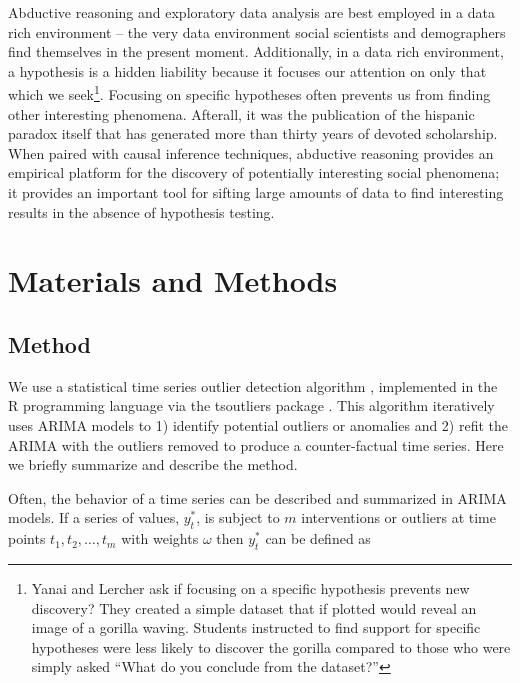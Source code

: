 \documentclass[12pt]{article}
\begin{document}
Abductive reasoning and exploratory data analysis are best employed in a
data rich environment -- the very data environment social scientists and
demographers find themselves in the present moment. Additionally, in a
data rich environment, a hypothesis is a hidden liability
\citep{yanai_hypothesis_2020}because it focuses our attention on only
that which we seek\footnote{Yanai and Lercher
  \citeyearpar{yanai_hypothesis_2020} ask if focusing on a specific
  hypothesis prevents new discovery? They created a simple dataset that
  if plotted would reveal an image of a gorilla waving. Students
  instructed to find support for specific hypotheses were less likely to
  discover the gorilla compared to those who were simply asked ``What do
  you conclude from the dataset?''}. Focusing on specific hypotheses
often prevents us from finding other interesting phenomena. Afterall, it
was the publication of the hispanic paradox itself that has generated
more than thirty years of devoted scholarship. When paired with causal
inference techniques, abductive reasoning provides an empirical platform
for the discovery of potentially interesting social phenomena; it
provides an important tool for sifting large amounts of data to find
interesting results in the absence of hypothesis testing.

\hypertarget{materials-and-methods}{%
\section{Materials and Methods}\label{materials-and-methods}}

\hypertarget{method}{%
\subsection{Method}\label{method}}

We use a statistical time series outlier detection algorithm
\citep{chen1993joint}, implemented in the R programming language
\citep{rcore} via the tsoutliers package \citep{tsoutliers2019}. This
algorithm iteratively uses ARIMA models to 1) identify potential
outliers or anomalies and 2) refit the ARIMA with the outliers removed
to produce a counter-factual time series. Here we briefly summarize and
describe the method.

Often, the behavior of a time series can be described and summarized in
ARIMA models. If a series of values, \(y_t^*\), is subject to \(m\)
interventions or outliers at time points \(t_1,t_2,…,t_m\) with weights
\(\omega\) then \(y_t^*\) can be defined as
\end{document}

